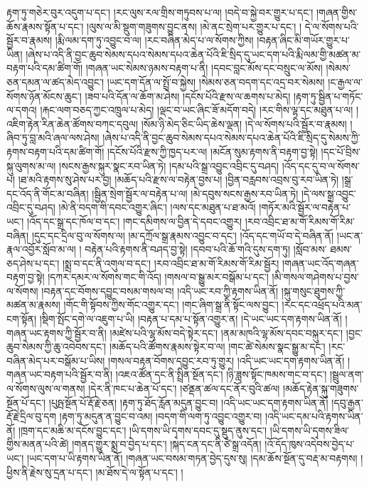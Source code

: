རྟག་ཏུ་གཅེར་བུར་འདུག་པ་དང་། །རང་ལུས་རལ་གྲིས་གཏུབས་པ་ལ། །བདེ་བ་སྐྱེ་བར་གྱུར་པ་དང་། །གཞན་གྱིས་ཆོས་རྣམས་སྟོན་པ་དང་། །ལུས་ལ་མི་སྡུག་གཟུགས་བྱུང་ནས། །མེ་ནང་སྲེག་པར་གྱུར་པ་དང་། །  ​ དེ་ལ་སོགས་པའི་སྦྱོར་བ་རྣམས། །རྨི་ལམ་དག་ཏུ་འབྱུང་བ་ལ། །རང་བཞིན་མེད་པ་ལ་སོགས་ཀྱིས། །བརྟན་ཞིང་མི་གཡོར་གྱུར་པ་ཡིན། །ཞེས་པ་འདི་ནི་བྱང་ཆུབ་སེམས་དཔའ་སེམས་དཔའ་ཆེན་པོའི་ཇི་སྲིད་དུ་ཡང་དག་པའི་རྨི་ལམ་གྱི་མཚན་མ་བརྟག་པའི་དམ་ཚིག་གོ། །གཞན་ཡང་སེམས་ཉམས་བརྟག་པ་ནི། །དབང་བླང་མོས་དང་བསྲུང་ལ་མོས། །སེམས་ཅན་དམན་ལ་ཚད་མེད་འབྱུང་། །ཡང་དག་དོན་ལ་སྤྲོ་བ་སྐྱེས། །སེམས་ཅན་བདག་དང་འདྲ་བར་སེམས། །ང་རྒྱལ་ལ་སོགས་ཉོན་མོངས་ཆུང་། །ཟབ་པའི་དོན་ལ་ཆོག་མ་ཤེས། །དངོས་པོའི་རྫས་ལ་ཆགས་པ་མེད། །རྟག་ཏུ་སྦྱིན་པ་གཏོང་ལ་དགའ། །རྐང་ལག་བཅད་ཀྱང་འཁྲུལ་པ་མེད། །ལྡང་བ་ཡང་ཞིང་ཟོ་མདོག་བདེ། །རང་གིས་ལྷ་དང་མཐུན་པ་ལ། །འཇིག་རྟེན་རིན་ཆེན་ཚོགས་བཀང་དབུལ། །སོམ་ཉི་མེད་ཅིང་ཡིད་ཆེས་ལྡན། །དེ་ལ་སོགས་པའི་སྦྱོར་བ་རྣམས། །ཞིབ་ཏུ་བླ་མའི་ཞལ་ལས་ཤེས། །ཞེས་པ་འདི་ནི་བྱང་ཆུབ་སེམས་དཔའ་སེམས་དཔའ་ཆེན་པོའི་ཇི་སྲིད་དུ་སེམས་ཀྱི་རྟགས་བརྟག་པའི་དམ་ཚིག་གོ། །དངོས་པོའི་རྫས་ཀྱི་ཁྱད་པར་ལ། །མངོན་སུམ་རྟགས་ནི་བརྟག་བྱ་སྟེ། །དང་པོ་བྲིས་སྐུ་ལུགས་མ་ལ། །སངས་རྒྱས་སྐུར་སྣང་རབ་ཡིན་ཏེ། །དམ་པའི་སྒྲ་འབྱུང་འབྲིང་དུ་བཤད། །འོད་དང་དུ་བ་ལ་སོགས་པ། །ཐ་མའི་རྟགས་སུ་ཤེས་པར་བྱ། །མཆོད་པའི་རྫས་ལ་བརྟེན་བྱས་པ། །བྱིན་བརླབས་འབྲས་བུ་རབ་ཡིན་ཏེ། །སྒྲ་དང་འོད་ནི་གོང་མ་བཞིན། །སྦྱིན་སྲེག་སྦྱོར་ལ་བརྟེན་པ་ལ། །མེ་དབུས་སངས་རྒྱས་རབ་ཡིན་ཏེ། །དེ་ལས་སྒྲ་འབྱུང་འབྲིང་དུ་བཤད། །མེ་ནི་བདག་གི་དབང་འགྱུར་ཞིང་། །ལས་དང་མཐུན་པ་ཐ་མའོ། །གཏོར་མའི་སྦྱོར་ལ་བརྟེན་པ་ཡང་། །འོད་དང་སྒྲ་དང་ཁོལ་བ་དང་། །གང་དམིགས་ལ་བྱིན་དེ་དབང་འགྱུར། །རབ་འབྲིང་ཐ་མ་{གོ་རིམས་གོ་རིམ་}བཞིན། །དུང་དང་དྲིལ་བུ་ལ་སོགས་ལ། །མ་དཀྲོལ་སྒྲ་རྣམས་འབྱུང་བ་དང་། །འོད་དང་གཡོ་བ་དེ་བཞིན་ནོ། །ཡང་ན་རྣལ་འབྱོར་སློབ་མ་ལ། །
བརྟེན་པའི་རྟགས་ནི་བཤད་བྱ་སྟེ། །དབབ་པའི་ཆོ་གའི་དུས་དག་ཏུ། །སློབ་མས་​ ཐམས་ཅད་ཤེས་པ་དང་། །སྨྲ་བ་དང་ནི་འགུལ་བ་དང་། །རབ་འབྲིང་ཐ་མ་{གོ་རིམས་གོ་རིམ་}སྦྱོར། །གཞན་ཡང་འོད་གཞན་བརྟག་བྱ་སྟེ། །དཀར་དམར་ལ་སོགས་གང་གི་འོད། །གསལ་བ་སྒྱུ་མར་བསྒོམ་པ་དང་། །མི་གསལ་གཤེགས་པ་བྱས་ལ་སོགས། །བརྟན་དང་བོགས་དབྱུང་བསམ་གསལ་བ། །འདི་ཡང་རབ་ཀྱི་རྟགས་ཡིན་ནོ། །སྐུ་གསུང་ཐུགས་ཀྱི་མཚན་མ་རྣམས། །གོང་གི་སྟོབས་ཀྱིས་གོང་འགྱུར་དང་། །གང་ཞིག་སྒྲ་ནི་སྟོང་ལས་བྱུང་། །རང་དང་འཕྲོད་པའི་མན་ངག་སྟོན། །སྡིག་སྤོང་དགེ་ལ་འཇུག་པ་ཡི། །བརྟན་པ་དམ་པ་སྟོན་འགྱུར་ན། །དེ་ཡང་ཡང་དག་རྟགས་ཡིན་ནོ། །གཞན་ཡང་རྟགས་ཀྱི་སྦྱོར་བ་ནི། །མཛེས་པའི་ལྷ་མོས་བདེ་སྟེར་དང་། །ནམ་མཁའི་ལྷ་མོས་དབང་བསྐུར་དང་། །བྱང་ཆུབ་སེམས་ཀྱི་ཆུ་འབེབས་དང་། །མཆོད་པའི་ཚོགས་རྣམས་སྟེར་བ་ལ། །གང་ཚེ་སེམས་སྣང་སྒྱུ་མ་དང་། །རང་བཞིན་མེད་པར་བསྒོམ་པ་ཡིས། །གསལ་བརྟན་བོགས་དབྱུང་རབ་ཏུ་གྱུར། །འདི་ཡང་ཡང་དག་རྟགས་ཡིན་ནོ། །གཞན་ཡང་བརྟག་པའི་སྦྱོར་བ་ནི། །འཇའ་ཚོན་དང་ནི་སྤྲིན་སྔོན་དང་། །ཉི་ཟླས་སྟོང་ཁམས་གང་བ་དང་། །སྦྲུལ་ནག་ལ་སོགས་ལུས་ལ་གནས། །དེར་ནི་ཁང་པ་ཆེན་པོ་དང་། །ཙནྡན་ཚལ་དང་ནོར་བུའི་ཚལ། །མཆོད་རྟེན་སྐུ་གཟུགས་སྔོན་པོ་དང་། །པུཥྤ་སྔོན་པོ་རྡོ་རྗེ་ཅན། །རྟག་ཏུ་ཐོད་རློན་མདུན་བྱུང་བ། །འདི་ཡང་ཡང་དག་རྟགས་ཡིན་ནོ། །དབུ་རྒྱན་རྡོ་རྗེ་དྲིལ་བུ་དག །རྟག་ཏུ་མདུན་ན་བྱུང་བ་འམ། །བདག་གི་ལག་ཏུ་འབྱུང་འགྱུར་བ། །འདི་ཡང་དམ་པའི་རྟགས་ཡིན་ནོ། །ཁྲག་དང་མཆི་མ་དངོས་བྱུང་དང་། །{ཡི་དགས་ཡི་དྭགས་}དབང་དུ་སྡུད་ནུས་དང་། །{ཡི་དགས་ཡི་དྭགས་}ཟིལ་གྱིས་མནན་པའི་ཚེ། །གནད་གྱུར་སྨྲ་བ་བྱེད་པ་དང་། །སྐད་ངན་དང་ནི་ཙེ་སྒྲ་འདོན། །འོ་དོད་ཁུས་འདེབས་བྱེད་པ་ཡང་། །ཡང་དག་པ་ཡི་རྟགས་ཡིན་ནོ། །གཞན་ཡང་བསམ་གཏན་བྱེད་དུས་སུ། །དམ་ཆོས་སྔོན་དུ་བརྡ་མ་བརྟགས། །ཕྱིས་ནི་རྗེས་སུ་དྲན་པ་དང་། །མ་ཐོས་དེ་ལ་སྟོན་པ་དང་། །
